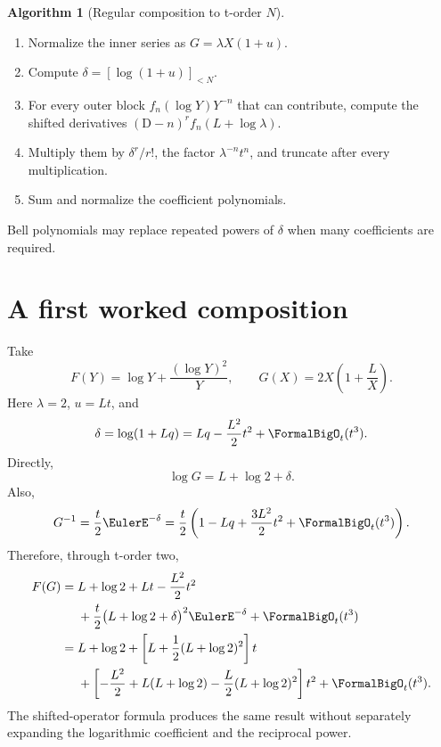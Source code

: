 \documentclass[11pt,openany]{book}
\theoremstyle{definition}
\newtheorem{algorithm}{Algorithm}[chapter]
\theoremstyle{plain}
\theoremstyle{remark}
\newcommand{\Dop}{\mathrm{D}}
\begin{document}
\begin{algorithm}[Regular composition to t-order \(N\)]\label{alg:regular-composition}
\leavevmode
\begin{enumerate}
\item Normalize the inner series as \(G=\lambda X(1+u)\).
\item Compute \(\delta=[\log(1+u)]_{<N}\).
\item For every outer block \(f_n(\log Y)Y^{-n}\) that can contribute, compute
      the shifted derivatives \((\Dop-n)^rf_n(L+\log\lambda)\).
\item Multiply them by \(\delta^r/r!\), the factor
      \(\lambda^{-n}t^n\), and truncate after every multiplication.
\item Sum and normalize the coefficient polynomials.
\end{enumerate}
Bell polynomials may replace repeated powers of \(\delta\) when many
coefficients are required.
\end{algorithm}

\section{A first worked composition}
Take
\[
 F(Y)=\log Y+\frac{(\log Y)^2}{Y},
 \qquad
 G(X)=2X\left(1+\frac{L}{X}\right).
\]
Here \(\lambda=2\), \(u=Lt\), and
\[
 \delta=\log(1+Lq)=Lq-\frac{L^2}{2}t^2+\FormalBigO_t(t^3).
\]
Directly,
\[
 \log G=L+\log2+\delta.
\]
Also,
\[
 G^{-1}=\frac{t}{2}\EulerE^{-\delta}
 =\frac t2\left(1-Lq+\frac{3L^2}{2}t^2+\FormalBigO_t(t^3)\right).
\]
Therefore, through t-order two,
\begin{align*}
 F(G)
={}&L+\log2+Lt-\frac{L^2}{2}t^2\\
&+\frac t2\bigl(L+\log2+\delta\bigr)^2\EulerE^{-\delta}
 +\FormalBigO_t(t^3)\\
={}&L+\log2
 +\left[L+\frac12(L+\log2)^2\right]t\\
&+\left[-\frac{L^2}{2}
 +L(L+\log2)-\frac L2(L+\log2)^2\right]t^2
 +\FormalBigO_t(t^3).
\end{align*}
The shifted-operator formula produces the same result without separately
expanding the logarithmic coefficient and the reciprocal power.
\end{document}
